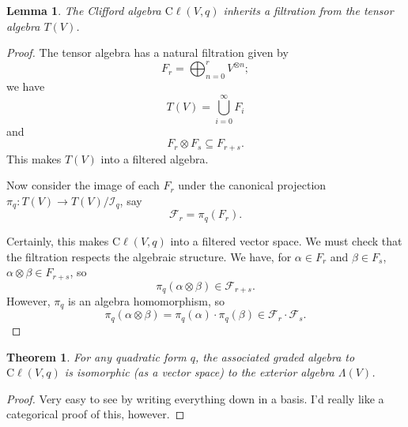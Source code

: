 \documentclass[a4paper]{report}
\newcommand{\cliff}{\mathrm{C}\ell}
\theoremstyle{definition}
\theoremstyle{plain}
\newtheorem{theorem}{Theorem}[section]
\newtheorem{lemma}{Lemma}[section]
\theoremstyle{remark}
\begin{document}
\begin{lemma}
  The Clifford algebra $\cliff(V,q)$ inherits a filtration from the tensor algebra $T(V)$.
\end{lemma}
\begin{proof}
  The tensor algebra has a natural filtration given by
  \begin{equation*}
    F_{r} = \bigoplus_{n=0}^{r} V^{\otimes n};
  \end{equation*}
  we have 
  \begin{equation*}
    T(V) = \bigcup_{i=0}^{\infty} F_{i}
  \end{equation*}
  and
  \begin{equation*}
    F_{r} \otimes F_{s} \subseteq F_{r+s}.
  \end{equation*}
  This makes $T(V)$ into a filtered algebra.

  Now consider the image of each $F_{r}$ under the canonical projection $\pi_{q}\colon T(V) \to T(V) / \mathscr{I}_{q}$, say
  \begin{equation*}
    \mathscr{F}_{r} = \pi_{q}(F_{r}).
  \end{equation*}

  Certainly, this makes $\cliff(V, q)$ into a filtered vector space. We must check that the filtration respects the algebraic structure. We have, for $\alpha \in F_{r}$ and $\beta \in F_{s}$, $\alpha \otimes \beta \in F_{r + s}$, so
  \begin{equation*}
    \pi_{q}(\alpha\otimes \beta) \in \mathscr{F}_{r+s}.
  \end{equation*}
  However, $\pi_{q}$ is an algebra homomorphism, so
  \begin{equation*}
    \pi_{q}(\alpha \otimes \beta) = \pi_{q}(\alpha) \cdot \pi_{q}(\beta) \in \mathscr{F}_{r} \cdot \mathscr{F}_{s}.
  \end{equation*}
\end{proof}

\begin{theorem}
  For any quadratic form $q$, the associated graded algebra to $\cliff(V,q)$ is isomorphic (as a vector space) to the exterior algebra $\Lambda(V)$.
\end{theorem}
\begin{proof}
  Very easy to see by writing everything down in a basis. I'd really like a categorical proof of this, however.
\end{proof}
\end{document}
